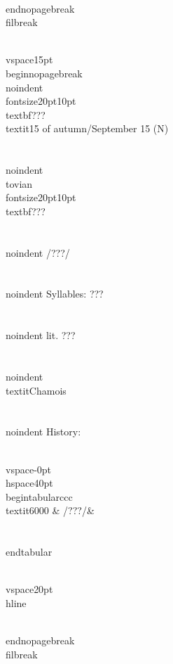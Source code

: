 \\end{nopagebreak}
\\filbreak



\\vspace{15pt}
\\begin{nopagebreak}
\\noindent{\\fontsize{20pt}{10pt}\\textbf{???} } \\textit{15 of autumn/September 15} (N)\\\\
\\noindent {\\tovian \\fontsize{20pt}{10pt} \\textbf{???} }\\\\
\\noindent /???/\\\\
\\noindent Syllables: ???\\\\
\\noindent lit. ???\\\\
\\noindent \\textit{Chamois}\\\\


\\noindent History:

\\vspace{-0pt}
\\hspace{40pt}
\\begin{tabular}{ccc}
\\textit{6000} & /???/& \\\\
\\end{tabular}

\\vspace{20pt}\\hline

\\end{nopagebreak}
\\filbreak



